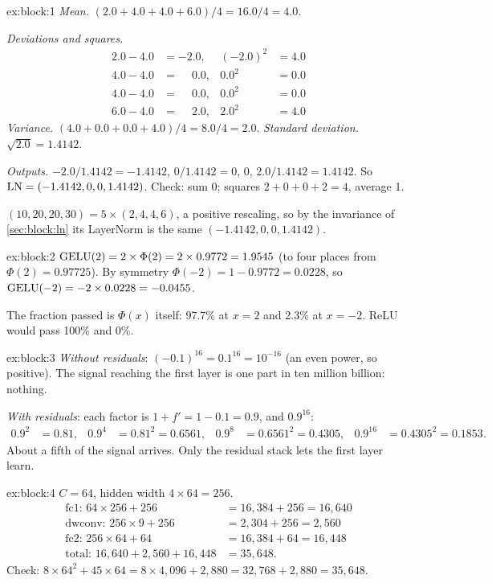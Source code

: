 
\begin{solution}{ex:block:1}
\emph{Mean.} $(2.0 + 4.0 + 4.0 + 6.0)/4 = 16.0/4 = 4.0$.

\emph{Deviations and squares.}
\begin{align*}
  2.0 - 4.0 &= -2.0, & (-2.0)^2 &= 4.0\\
  4.0 - 4.0 &= \phantom{-}0.0, & 0.0^2 &= 0.0\\
  4.0 - 4.0 &= \phantom{-}0.0, & 0.0^2 &= 0.0\\
  6.0 - 4.0 &= \phantom{-}2.0, & 2.0^2 &= 4.0
\end{align*}
\emph{Variance.} $(4.0 + 0.0 + 0.0 + 4.0)/4 = 8.0/4 = 2.0$. \emph{Standard deviation.}
$\sqrt{2.0} = 1.4142$.

\emph{Outputs.} $-2.0/1.4142 = -1.4142$, $0/1.4142 = 0$, $0$, $2.0/1.4142 = 1.4142$. So
$\operatorname{LN} = (-1.4142, 0, 0, 1.4142)$. Check: sum 0; squares $2 + 0 + 0 + 2 = 4$, average 1.

$(10, 20, 20, 30) = 5\times(2, 4, 4, 6)$, a positive rescaling, so by the invariance of
\cref{sec:block:ln} its LayerNorm is the same $(-1.4142, 0, 0, 1.4142)$.
\end{solution}

\begin{solution}{ex:block:2}
$\operatorname{GELU}(2) = 2\times\Phi(2) = 2\times0.9772 = 1.9545$ (to four places from $\Phi(2) = 0.97725$).
By symmetry $\Phi(-2) = 1 - 0.9772 = 0.0228$, so $\operatorname{GELU}(-2) = -2\times0.0228 = -0.0455$.

The fraction passed is $\Phi(x)$ itself: 97.7\% at $x = 2$ and 2.3\% at $x = -2$. ReLU would pass
100\% and 0\%.
\end{solution}

\begin{solution}{ex:block:3}
\emph{Without residuals}: $(-0.1)^{16} = 0.1^{16} = 10^{-16}$ (an even power, so positive). The
signal reaching the first layer is one part in ten million billion: nothing.

\emph{With residuals}: each factor is $1 + f' = 1 - 0.1 = 0.9$, and $0.9^{16}$:
\begin{align*}
  0.9^2 &= 0.81, & 0.9^4 &= 0.81^2 = 0.6561, & 0.9^8 &= 0.6561^2 = 0.4305, & 0.9^{16} &= 0.4305^2 = 0.1853 .
\end{align*}
About a fifth of the signal arrives. Only the residual stack lets the first layer learn.
\end{solution}

\begin{solution}{ex:block:4}
$C = 64$, hidden width $4\times64 = 256$.
\begin{align*}
  \text{fc1: } 64\times256 + 256 &= 16{,}384 + 256 = 16{,}640\\
  \text{dwconv: } 256\times9 + 256 &= 2{,}304 + 256 = 2{,}560\\
  \text{fc2: } 256\times64 + 64 &= 16{,}384 + 64 = 16{,}448\\
  \text{total: } 16{,}640 + 2{,}560 + 16{,}448 &= 35{,}648 .
\end{align*}
Check: $8\times64^2 + 45\times64 = 8\times4{,}096 + 2{,}880 = 32{,}768 + 2{,}880 = 35{,}648$.
\end{solution}


